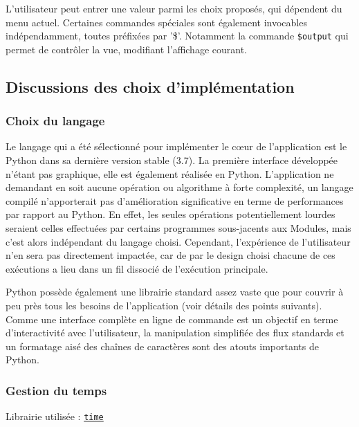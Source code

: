 \documentclass[]{article}
\begin{document}
\par L'utilisateur peut entrer une valeur parmi les choix proposés, qui dépendent du menu actuel. Certaines commandes spéciales sont également invocables indépendamment, toutes préfixées par '\$'. Notamment la commande \texttt{\$output} qui permet de contrôler la vue, modifiant l'affichage courant.


\newpage

\subsection{Discussions des choix d'implémentation}

\subsubsection{Choix du langage}

Le langage qui a été sélectionné pour implémenter le cœur de l'application est le Python dans sa dernière version stable (3.7). La première interface développée n'étant pas graphique, elle est également réalisée en Python. L'application ne demandant en soit aucune opération ou algorithme à forte complexité, un langage compilé n'apporterait pas d'amélioration significative en terme de performances par rapport au Python. En effet, les seules opérations potentiellement lourdes seraient celles effectuées par certains programmes sous-jacents aux Modules, mais c'est alors indépendant du langage choisi. Cependant, l'expérience de l'utilisateur n'en sera pas directement impactée, car de par le design choisi chacune de ces exécutions a lieu dans un fil dissocié de l'exécution principale.\\

\par Python possède également une librairie standard assez vaste que pour couvrir à peu près tous les besoins de l'application (voir détails des points suivants). Comme une interface complète en ligne de commande est un objectif en terme d'interactivité avec l'utilisateur, la manipulation simplifiée des flux standards et un formatage aisé des chaînes de caractères sont des atouts importants de Python.

\subsubsection{Gestion du temps}

\noindent Librairie utilisée : \href{https://docs.python.org/3/library/time.html}{\texttt{time}}\\
\end{document}
